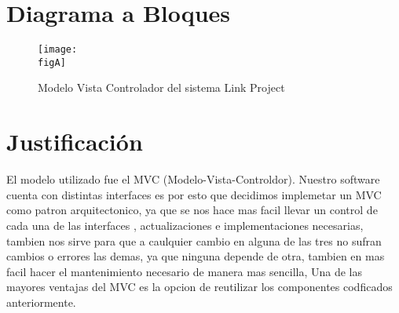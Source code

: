 	\restoregeometry %

	\clearpage
	\tableofcontents




	\clearpage
	\vspace*{-16pt}
	\begin{center}
		{\textbf{\huge \theTitle}}
	\end{center}
	\vspace*{8pt}

	\section{Diagrama a Bloques}


	\begin{figure}[h]
		\centering
		\texttt{[image: \\figA]}
		\caption{Modelo Vista Controlador del sistema Link Project}
	\end{figure}

	\section{Justificación}

	El modelo utilizado fue el MVC (Modelo-Vista-Controldor). Nuestro software cuenta con distintas interfaces es por esto que decidimos implemetar un MVC como patron arquitectonico, ya que se nos hace mas facil llevar un control de cada una de las interfaces , actualizaciones e implementaciones necesarias, tambien nos sirve para que a caulquier cambio en alguna de las tres no sufran cambios o errores las demas, ya que ninguna depende de otra, tambien en mas facil hacer el mantenimiento necesario de manera mas sencilla, Una de las mayores ventajas del MVC es la opcion de reutilizar los componentes codficados anteriormente.

